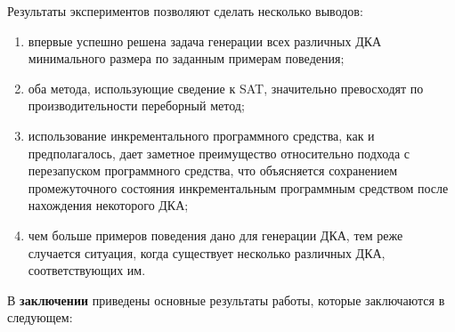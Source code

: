 Результаты экспериментов позволяют сделать несколько выводов:
\begin{enumerate}
  \item впервые успешно решена задача генерации всех различных ДКА минимального размера по заданным примерам поведения;
  \item оба метода, использующие сведение к SAT, значительно превосходят по производительности переборный метод;
  \item использование инкрементального программного средства, как и предполагалось, дает заметное преимущество относительно подхода с перезапуском программного средства, что объясняется сохранением промежуточного состояния инкрементальным программным средством после нахождения некоторого ДКА;
  \item чем больше примеров поведения дано для генерации ДКА, тем реже случается ситуация, когда существует несколько различных ДКА, соответствующих им.
\end{enumerate}



В \textbf{заключении} приведены основные результаты работы, которые заключаются в следующем:


